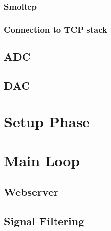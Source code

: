 \subsubsection{Smoltcp}
\subsubsection{Connection to TCP stack}

\subsection{ADC}

\subsection{DAC}


\section{Setup Phase}


\section{Main Loop}

\subsection{Webserver}

\subsection{Signal Filtering}
